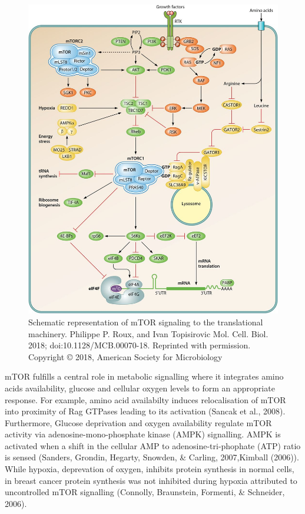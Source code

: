 \documentclass[12pt,openany]{book}
\begin{document}
\begin{figure}
  \includegraphics{./figures/mTORsignal.jpg}
  \caption{Schematic representation of mTOR signaling to the translational machinery. Philippe P. Roux, and Ivan Topisirovic Mol. Cell. Biol. 2018; doi:10.1128/MCB.00070-18. Reprinted with permission. Copyright © 2018, American Society for Microbiology
 \label{fig:mtorsignal}}
\end{figure}

mTOR fulfills a central role in metabolic signalling where it integrates
amino acids availability, glucose and cellular oxygen levels to form an
appropriate response. For example, amino acid availabilty induces
relocalisation of mTOR into proximity of Rag GTPases leading to its
activation (Sancak et al., 2008). Furthermore, Glucose deprivation and
oxygen availability regulate mTOR activity via adenosine-mono-phosphate
kinase (AMPK) signalling. AMPK is activated when a shift in the cellular
AMP to adenosine-tri-phophate (ATP) ratio is sensed (Sanders, Grondin,
Hegarty, Snowden, \& Carling, 2007,Kimball (2006)). While hypoxia,
deprevation of oxygen, inhibits protein synthesis in normal cells, in
breast cancer protein synthesis was not inhibited during hypoxia
attributed to uncontrolled mTOR signalling (Connolly, Braunstein,
Formenti, \& Schneider, 2006).
\end{document}

